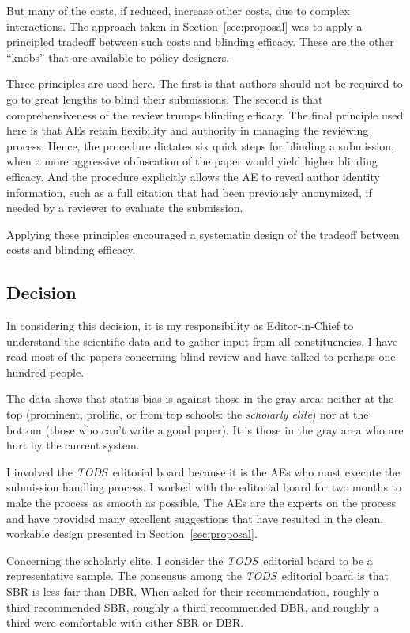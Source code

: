 \documentclass[acmtods,acmnow]{acmtrans2m}
\newcommand{\tods}{{\em TODS\/}}
\begin{document}
But many of the costs, if reduced, increase other costs, due to complex
interactions. The approach taken in Section~\ref{sec:proposal} was to apply
a principled tradeoff between such costs and blinding efficacy. These are
the other ``knobs'' that are available to policy designers.

Three principles are used here. The first is that authors should not be
required to go to great lengths to blind their submissions. The second is
that comprehensiveness of the review trumps blinding efficacy. The final
principle used here is that AEs retain flexibility and authority in managing
the reviewing process.  Hence, the procedure dictates six quick steps for
blinding a submission, when a more aggressive obfuscation of the paper would
yield higher blinding efficacy. And the procedure explicitly allows the AE to
reveal author identity information, such as a full citation that had been
previously anonymized, if needed by a reviewer to evaluate the submission.

Applying these principles encouraged a systematic design of the tradeoff
between costs and blinding efficacy.

\subsection{Decision}

In considering this decision, it is my responsibility as Editor-in-Chief to
understand the scientific data and to gather input from all
constituencies. I have read most of the papers concerning blind review and
have talked to perhaps one hundred people.

The data shows that status bias is against those in the gray area:
neither at the top (prominent, prolific, or from top schools: the
{\em scholarly elite}) nor at the bottom (those who can't write a good
paper). It is those in the gray area who are hurt by the current
system.

I involved the \tods\ editorial board because it is the AEs who must execute
the submission handling process.  I worked with the editorial board for two
months to make the process as smooth as possible. The AEs are the experts on
the process and have provided many excellent suggestions that have resulted
in the clean, workable design presented in Section~\ref{sec:proposal}.

Concerning the scholarly elite, I consider the \tods\ editorial board to be a
representative sample. The consensus among the \tods\ editorial board is
that SBR is less fair than DBR. When asked for their recommendation,
roughly a third recommended SBR, roughly a third recommended
DBR, and roughly a third were comfortable with either SBR or DBR.
\end{document}

